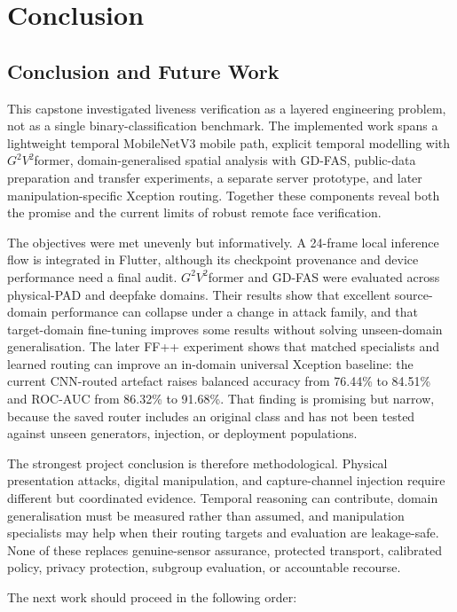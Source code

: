 \chapter{Conclusion}
\label{ch:conclusion}

\section{Conclusion and Future Work}

This capstone investigated liveness verification as a layered engineering problem,
not as a single binary-classification benchmark. The implemented work spans a
lightweight temporal MobileNetV3 mobile path, explicit temporal modelling with
$G^2V^2$former, domain-generalised spatial analysis with GD-FAS, public-data
preparation and transfer experiments, a separate server prototype, and later
manipulation-specific Xception routing. Together these components reveal both the
promise and the current limits of robust remote face verification.

The objectives were met unevenly but informatively. A 24-frame local inference
flow is integrated in Flutter, although its checkpoint provenance and device
performance need a final audit. $G^2V^2$former and GD-FAS were evaluated across
physical-PAD and deepfake domains. Their results show that excellent source-domain
performance can collapse under a change in attack family, and that target-domain
fine-tuning improves some results without solving unseen-domain generalisation.
The later FF++ experiment shows that matched specialists and learned routing can
improve an in-domain universal Xception baseline: the current CNN-routed artefact
raises balanced accuracy from 76.44\% to 84.51\% and ROC-AUC from 86.32\% to
91.68\%. That finding is promising but narrow, because the saved router includes
an original class and has not been tested against unseen generators, injection,
or deployment populations.

The strongest project conclusion is therefore methodological. Physical
presentation attacks, digital manipulation, and capture-channel injection require
different but coordinated evidence. Temporal reasoning can contribute, domain
generalisation must be measured rather than assumed, and manipulation specialists
may help when their routing targets and evaluation are leakage-safe. None of
these replaces genuine-sensor assurance, protected transport, calibrated policy,
privacy protection, subgroup evaluation, or accountable recourse.

The next work should proceed in the following order:

